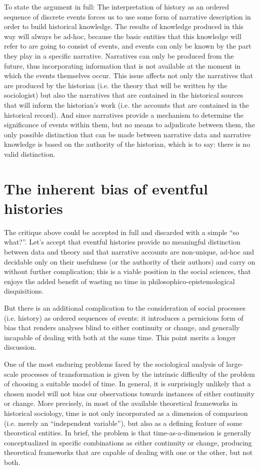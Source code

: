 To state the argument in full:
The interpretation of history as an ordered sequence of discrete events forces us to use some form of narrative description in order to build historical knowledge.
The results of knowledge produced in this way will always be ad-hoc, because the basic entities that this knowledge will refer to are going to consist of events, and events can only be known by the part they play in a specific narrative.
Narratives can only be produced from the future, thus incorporating information that is not available at the moment in which the events themselves occur.
This issue affects not only the narratives that are produced by the historian (i.e. the theory that will be written by the sociologist) but also the narratives that are contained in the historical sources that will inform the historian's work (i.e. the accounts that are contained in the historical record).
And since narratives provide a mechanism to determine the significance of events within them, but no means to adjudicate between them, the only possible distinction that can be made between narrative data and narrative knowledge is based on the authority of the historian, which is to say: there is no valid distinction.

\section*{The inherent bias of eventful histories}
\label{sec:bias}

The critique above could be accepted in full and discarded with a simple ``so what?''.
Let's accept that eventful histories provide no meaningful distinction between data and theory and that narrative accounts are non-unique, ad-hoc and decidable only on their usefulness (or the authority of their authors) and carry on without further complication; this is a viable position in the social sciences, that enjoys the added benefit of wasting no time in philosophico-epistemological disquisitions.

But there is an additional complication to the consideration of social processes (i.e. history) as ordered sequences of events: it introduces a pernicious form of bias that renders analyses blind to either continuity or change, and generally incapable of dealing with both at the same time.
This point merits a longer discussion.

One of the most enduring problems faced by the sociological analysis of large-scale processes of transformation is given by the intrinsic difficulty of the problem of choosing a suitable model of time.
In general, it is surprisingly unlikely that a chosen model will not bias our observations towards instances of either continuity or change.
More precisely, in most of the available theoretical frameworks in historical sociology, time is not only incorporated as a dimension of comparison (i.e. merely an ``independent variable''), but also as a defining feature of some theoretical entities.
In brief, the problem is that time-as-a-dimension is generally conceptualized in specific combinations as either continuity or change, producing theoretical frameworks that are capable of dealing with one or the other, but not both.

